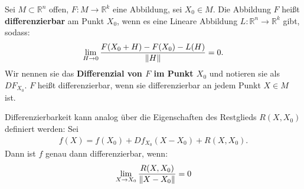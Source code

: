 \documentclass{report}
\newcommand{\tbf}[1]{\textbf{#1}}
\newcommand{\bR}{\mathbb{R}}
\begin{document}
\begin{definition}
 Sei $M \subset \bR^n$ offen, $F : M \to \bR^k$ eine Abbildung, sei $X_0 \in M$. Die Abbildung $F$ heißt \tbf{differenzierbar} am Punkt $X_0$, wenn es eine Lineare Abbildung $L : \bR^n \to \bR^k$ gibt, sodass:
 \begin{align*}
  \lim_{H \to 0} \frac{F(X_0 + H) - F(X_0) - L(H)}{\norm{H}} = 0.
 \end{align*}
 Wir nennen sie das \tbf{Differenzial von $F$ im Punkt $X_0$} und notieren sie als $DF_{X_0}$. $F$ heißt differenzierbar, wenn sie differenzierbar an jedem Punkt $X \in M$ ist.
\end{definition}
\begin{anmerkung}
 Differenzierbarkeit kann analog über die Eigenschaften des Restglieds $R(X, X_0)$ definiert werden: Sei
 \begin{align*}
  f(X) = f(X_0) + D f_{X_0}(X - X_0) + R(X, X_0).
 \end{align*}
 Dann ist $f$ genau dann differenzierbar, wenn:
 \begin{align*}
  \lim_{X \to X_0} \frac{R(X, X_0)}{\norm{X - X_0}} = 0
 \end{align*}

\end{anmerkung}
\end{document}

